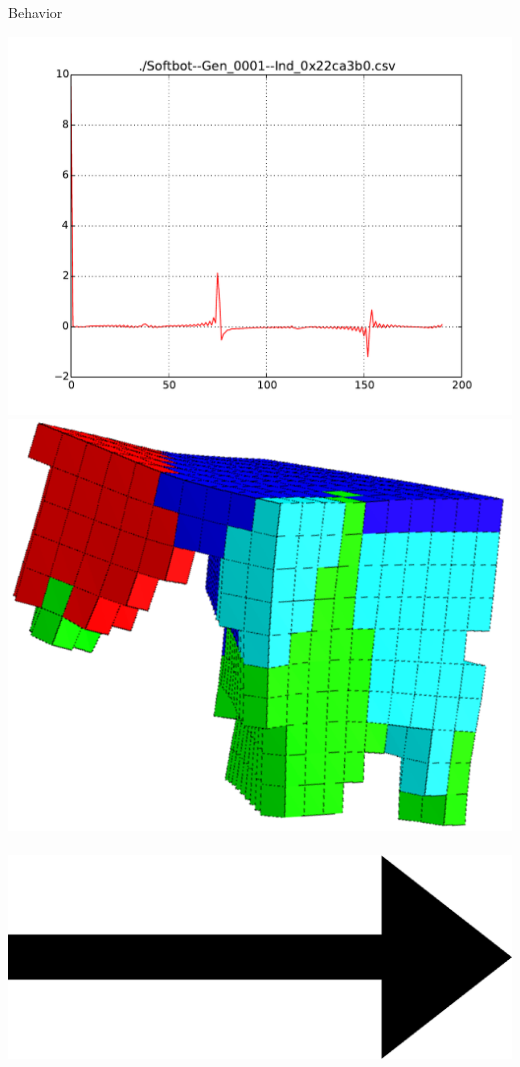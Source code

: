 \documentclass{beamer}
\begin{document}
\begin{frame}{Behavior}
\begin{center}
\includegraphics[height=0.15\textheight]{figures/behaviorPaceDFT.pdf}
\\
\includegraphics[height=0.15\textheight]{figures/unshacklingEvolutionFigure2.png}\	
\includegraphics[height=0.05\textheight]{figures/Arrow_east.eps}\	

\end{center}
\end{frame}
\end{document}
